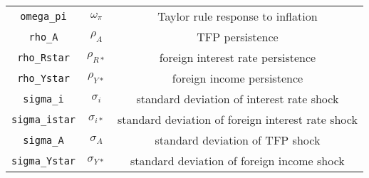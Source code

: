 \begin{center}
\begin{longtable}{ccc}
\texttt{omega\_pi} & $\omega_{\pi}$ & Taylor rule response to inflation\\
\texttt{rho\_A} & $\rho_{A}$ & TFP persistence\\
\texttt{rho\_Rstar} & $\rho_{R*}$ & foreign interest rate persistence\\
\texttt{rho\_Ystar} & $\rho_{Y*}$ & foreign income persistence\\
\texttt{sigma\_i} & $\sigma_{i}$ & standard deviation of interest rate shock\\
\texttt{sigma\_istar} & $\sigma_{i*}$ & standard deviation of foreign interest rate shock\\
\texttt{sigma\_A} & $\sigma_{A}$ & standard deviation of TFP shock\\
\texttt{sigma\_Ystar} & $\sigma_{Y*}$ & standard deviation of foreign income shock\\
\hline%
\end{longtable}
\end{center}
